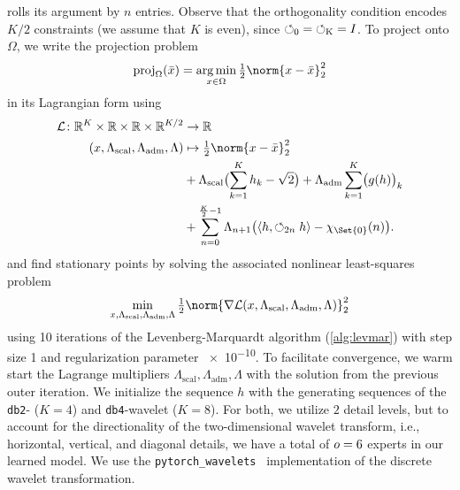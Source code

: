 rolls its argument by \( n \) entries.
Observe that the orthogonality condition encodes \( K / \num{2} \) constraints (we assume that \( K \) is even), since \( \operatorname{\circlearrowleft_{\num{0}}} = \operatorname{\circlearrowleft_{K}} = I \).
To project onto \( \Omega \), we write the projection problem
\begin{equation}
	\proj_{\Omega} (\bar{x}) = \argmin_{x \in \Omega} \Half \norm{x - \bar{x}}_{\num{2}}^{\num{2}}
\end{equation}
in its Lagrangian form using \(\)
\begin{equation}
	\begin{aligned}
		\map{\mathcal{L}}{\R^K \times \R \times \R \times \R^{K/\num{2}}&}{\R} \\
		(x, \Lambda_{\mathrm{scal}}, \Lambda_{\mathrm{adm}}, \Lambda)
																  &\mapsto \Half \norm{x - \bar{x}}_{\num{2}}^{\num{2}}\\
		&+ \Lambda_{\mathrm{scal}} \bigl( \sum_{k=\num{1}}^K h_k - \sqrt{\num{2}} \bigr)
		+ \Lambda_{\mathrm{adm}} \sum_{k=\num{1}}^K \bigl(g(h)\bigr)_k \\
		&+ \sum_{n = \num{0}}^{\frac{K}{2}-1} \Lambda_{n+1} \bigl( \langle h, \circlearrowleft_{2n} h \rangle - \chi_{\Set{\num{0}}}(n) \bigr).
	\end{aligned}
\end{equation}
and find stationary points by solving the associated nonlinear least-squares problem
\begin{equation}
	\min_{x, \Lambda_{\mathrm{scal}}, \Lambda_{\mathrm{adm}}, \Lambda} \Half \norm{\nabla \mathcal{L}(x, \Lambda_{\mathrm{scal}}, \Lambda_{\mathrm{adm}}, \Lambda)}_{\num{2}}^{\num{2}}
\end{equation}
using \num{10} iterations of the Levenberg-Marquardt algorithm (\cref{alg:levmar}) with step size \num{1} and regularization parameter \num{e-10}.
To facilitate convergence, we warm start the Lagrange multipliers \( \Lambda_{\mathrm{scal}}, \Lambda_{\mathrm{adm}}, \Lambda \) with the solution from the previous outer iteration.
We initialize the sequence \( h \) with the generating sequences of the \texttt{db2}- (\( K = \num{4} \)) and \texttt{db4}-wavelet (\( K = \num{8} \)).
For both, we utilize \( \num{2} \) detail levels, but to account for the directionality of the two-dimensional wavelet transform, i.e., horizontal, vertical, and diagonal details, we have a total of \( o = \num{6} \) experts in our learned model.
We use the \texttt{pytorch\_wavelets}~\cite{cotter_complex_2020} implementation of the discrete wavelet transformation.

